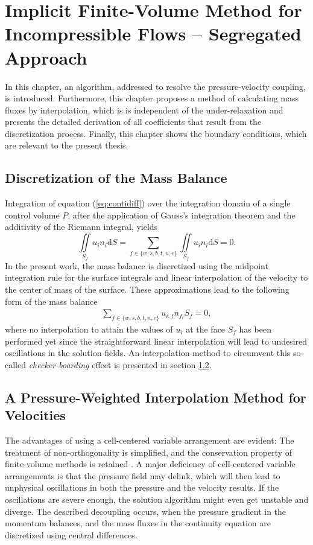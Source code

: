 \chapter{Implicit Finite-Volume Method for Incompressible Flows -- Segregated Approach}
\label{sec:seg}
In this chapter, an algorithm, addressed to resolve the pressure-velocity coupling, is introduced. Furthermore, this chapter proposes a method of calculating mass fluxes by interpolation, which is is independent of the under-relaxation and presents the detailed derivation of all coefficients that result from the discretization process. Finally, this chapter shows the boundary conditions, which are relevant to the present thesis.

\section{Discretization of the Mass Balance}

Integration of equation (\ref{eq:contidiff}) over the integration domain of a single control volume \(P\), after the application of Gauss's integration theorem and the additivity of the Riemann integral, yields
\begin{displaymath}
  \iint\limits_{S_f} u_i n_i \mathrm{d}S = \sum_{f \in \{w,s,b,t,n,e\}} \iint\limits_{S_f} u_i n_{i} \mathrm{d}S = 0.
\end{displaymath}
In the present work, the mass balance is discretized using the midpoint integration rule for the surface integrals and linear interpolation of the velocity to the center of mass of the surface. These approximations lead to the following form of the mass balance
\begin{align}
  \label{eq:massbalance}
  \sum_{f \in \{w,s,b,t,n,e\}} u_{i,f} n_{f_i} S_f = 0,
\end{align}
where no interpolation to attain the values of \(u_i\) at the face \(S_f\) has been performed yet since the straightforward linear interpolation will lead to undesired oscillations in the solution fields. An interpolation method to circumvent this so-called \emph{checker-boarding} effect is presented in section \ref{sec:massflux}.

\section{A Pressure-Weighted Interpolation Method for Velocities}
\label{sec:massflux}

The advantages of using a cell-centered variable arrangement are evident: The treatment of non-orthogonality is simplified, and the conservation property of finite-volume methods is retained \cite{choi99,majumdar88,miller88,zhang14}. A major deficiency of cell-centered variable arrangements is that the pressure field may delink, which will then lead to unphysical oscillations in both the pressure and the velocity results. If the oscillations are severe enough, the solution algorithm might even get unstable and diverge. The described decoupling occurs, when the pressure gradient in the momentum balances, and the mass fluxes in the continuity equation are discretized using central differences. 
  

